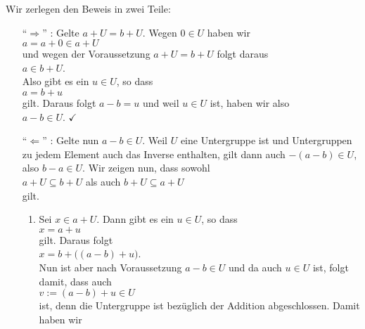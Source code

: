 \proof
Wir zerlegen den Beweis in zwei Teile:
\begin{enumerate}
\item[``$\Rightarrow$'']:
  Gelte $a + U = b + U$.  Wegen $0 \in U$ haben wir
  \\[0.2cm]
  \hspace*{1.3cm}
  $a = a + 0 \in a + U$
  \\[0.2cm]
  und wegen der Voraussetzung $a + U = b + U$ folgt daraus
  \\[0.2cm]
  \hspace*{1.3cm}
  $a \in b + U$.
  \\[0.2cm]
  Also gibt es ein $u \in U$, so dass
  \\[0.2cm]
  \hspace*{1.3cm}
  $a = b + u$
  \\[0.2cm]
  gilt.  Daraus folgt $a - b = u$ und weil $u \in U$ ist, haben wir also
  \\[0.2cm]
  \hspace*{1.3cm}
  $a - b \in U$.  $\checkmark$
\item[``$\Leftarrow$'']: Gelte nun $a - b \in U$.  Weil $U$ eine Untergruppe ist und Untergruppen zu jedem
  Element auch das Inverse enthalten, gilt dann auch $-(a -b) \in U$, also $b - a \in U$.  Wir zeigen
  nun, dass sowohl
  \\[0.2cm]
  \hspace*{1.3cm} 
  $a + U \subseteq b + U$ \quad als auch \quad
  $b + U \subseteq a + U$ 
  \\[0.2cm]
  gilt.
  \begin{enumerate}
  \item Sei $x \in a + U$.  Dann gibt es ein $u \in U$, so dass
        \\[0.2cm]
        \hspace*{1.3cm}
        $x = a + u$
        \\[0.2cm]
        gilt.  Daraus folgt
        \\[0.2cm]
        \hspace*{1.3cm}
        $x = b + \bigl((a - b) + u\bigr)$.
        \\[0.2cm]
        Nun ist aber nach Voraussetzung $a - b \in U$ und da auch $u \in U$ ist, folgt damit, dass auch
        \\[0.2cm]
        \hspace*{1.3cm}
        $v := (a - b) + u \in U$
        \\[0.2cm]
        ist, denn die Untergruppe ist bezüglich der Addition abgeschlossen.  Damit haben wir

\end{enumerate}
\end{enumerate}
